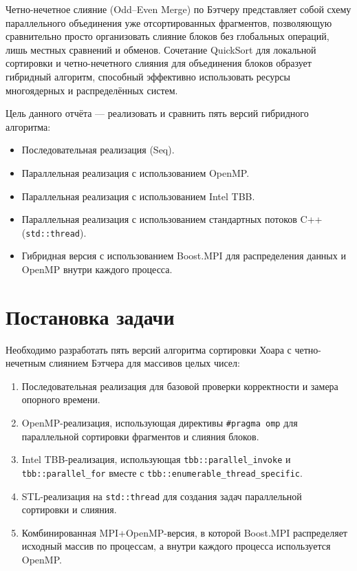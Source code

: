 \documentclass[12pt]{article}
\begin{document}
\hspace*{1.25em}Четно-нечетное слияние (Odd–Even Merge) по Бэтчеру представляет собой схему параллельного объединения уже отсортированных фрагментов, позволяющую сравнительно просто организовать слияние блоков без глобальных операций, лишь местных сравнений и обменов. Сочетание QuickSort для локальной сортировки и четно-нечетного слияния для объединения блоков образует гибридный алгоритм, способный эффективно использовать ресурсы многоядерных и распределённых систем. 

\hspace*{1.25em}Цель данного отчёта — реализовать и сравнить пять версий гибридного алгоритма:
\begin{itemize}
    \item Последовательная реализация (Seq).
    \item Параллельная реализация с использованием OpenMP.
    \item Параллельная реализация с использованием Intel TBB.
    \item Параллельная реализация с использованием стандартных потоков C++ (\texttt{std::thread}).
    \item Гибридная версия с использованием Boost.MPI для распределения данных и OpenMP внутри каждого процесса.
\end{itemize}

\section{Постановка задачи}
\hspace*{1.25em}Необходимо разработать пять версий алгоритма сортировки Хоара с четно-нечетным слиянием Бэтчера для массивов целых чисел:
\begin{enumerate}
    \item Последовательная реализация для базовой проверки корректности и замера опорного времени.
    \item OpenMP-реализация, использующая директивы \texttt{\#pragma omp} для параллельной сортировки фрагментов и слияния блоков.
    \item Intel TBB-реализация, использующая \texttt{tbb::parallel\_invoke} и \texttt{tbb::parallel\_for} вместе с \texttt{tbb::enumerable\_thread\_specific}.
    \item STL-реализация на \texttt{std::thread} для создания задач параллельной сортировки и слияния.
    \item Комбинированная MPI+OpenMP-версия, в которой Boost.MPI распределяет исходный массив по процессам, а внутри каждого процесса используется OpenMP.
\end{enumerate}
\end{document}
